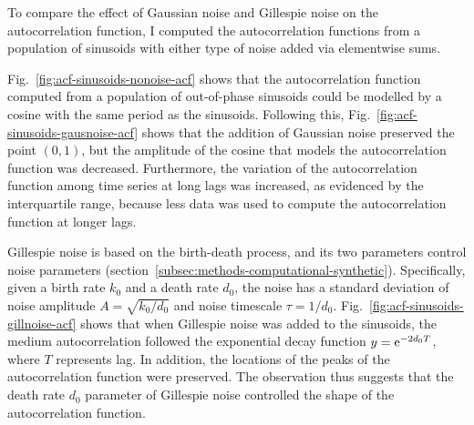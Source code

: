 To compare the effect of Gaussian noise and Gillespie noise on the autocorrelation function, I computed the autocorrelation functions from a population of sinusoids with either type of noise added via elementwise sums.


Fig.\ \ref{fig:acf-sinusoids-nonoise-acf} shows that the autocorrelation function computed from a population of out-of-phase sinusoids could be modelled by a cosine with the same period as the sinusoids.
Following this, Fig.\ \ref{fig:acf-sinusoids-gausnoise-acf} shows that the addition of Gaussian noise preserved the point $(0,1)$, but the amplitude of the cosine that models the autocorrelation function was decreased.
Furthermore, the variation of the autocorrelation function among time series at long lags was increased, as evidenced by the interquartile range, because less data was used to compute the autocorrelation function at longer lags.%

Gillespie noise is based on the birth-death process, and its two parameters control noise parameters (section~\ref{subsec:methods-computational-synthetic}).
Specifically, given a birth rate $k_{0}$ and a death rate $d_{0}$, the noise has a standard deviation of noise amplitude $A = \sqrt{k_{0}/d_{0}}$ and noise timescale $\tau = 1/d_{0}$.
Fig.\ \ref{fig:acf-sinusoids-gillnoise-acf} shows that when Gillespie noise was added to the sinusoids, the medium autocorrelation followed the exponential decay function $y = \mathrm{e}^{-2d_{0}T}$, where $T$ represents lag.
In addition, the locations of the peaks of the autocorrelation function were preserved.
The observation thus suggests that the death rate $d_{0}$ parameter of Gillespie noise controlled the shape of the autocorrelation function.


